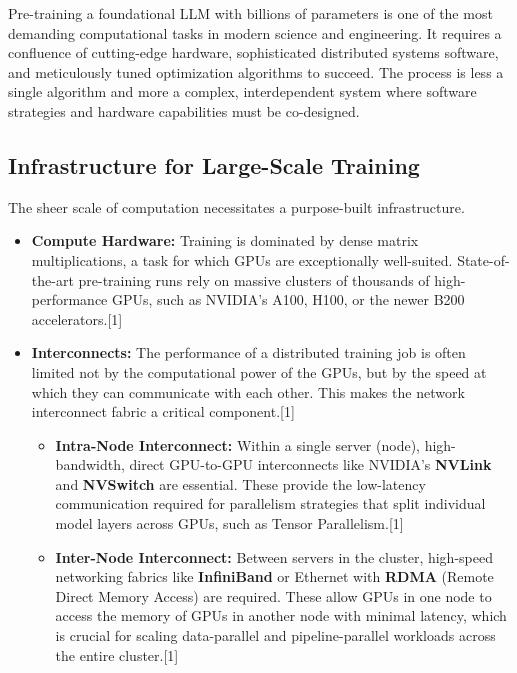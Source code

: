 \documentclass[12pt, a4paper]{article}
\begin{document}
Pre-training a foundational LLM with billions of parameters is one of the most demanding computational tasks in modern science and engineering. It requires a confluence of cutting-edge hardware, sophisticated distributed systems software, and meticulously tuned optimization algorithms to succeed. The process is less a single algorithm and more a complex, interdependent system where software strategies and hardware capabilities must be co-designed.

\subsection{Infrastructure for Large-Scale Training}

The sheer scale of computation necessitates a purpose-built infrastructure.

\begin{itemize}
    \item \textbf{Compute Hardware:} Training is dominated by dense matrix multiplications, a task for which GPUs are exceptionally well-suited. State-of-the-art pre-training runs rely on massive clusters of thousands of high-performance GPUs, such as NVIDIA's A100, H100, or the newer B200 accelerators.[1]
    \item \textbf{Interconnects:} The performance of a distributed training job is often limited not by the computational power of the GPUs, but by the speed at which they can communicate with each other. This makes the network interconnect fabric a critical component.[1]
    \begin{itemize}
        \item \textbf{Intra-Node Interconnect:} Within a single server (node), high-bandwidth, direct GPU-to-GPU interconnects like NVIDIA's \textbf{NVLink} and \textbf{NVSwitch} are essential. These provide the low-latency communication required for parallelism strategies that split individual model layers across GPUs, such as Tensor Parallelism.[1]
        \item \textbf{Inter-Node Interconnect:} Between servers in the cluster, high-speed networking fabrics like \textbf{InfiniBand} or Ethernet with \textbf{RDMA} (Remote Direct Memory Access) are required. These allow GPUs in one node to access the memory of GPUs in another node with minimal latency, which is crucial for scaling data-parallel and pipeline-parallel workloads across the entire cluster.[1]
    \end{itemize}
\end{itemize}
\end{document}
